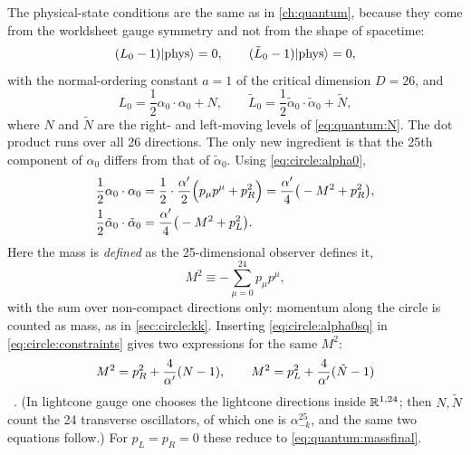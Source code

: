 The physical-state conditions are the same as in \cref{ch:quantum}, because they come from the
worldsheet gauge symmetry and not from the shape of spacetime:
\begin{equation}\label{eq:circle:constraints}
 (L_0-1)|\text{phys}\rangle=0,\qquad(\tilde L_0-1)|\text{phys}\rangle=0 ,
\end{equation}
with the normal-ordering constant $a=1$ of the critical dimension $D=26$, and
\begin{equation}\label{eq:circle:L0}
 L_0=\frac12\alpha_0\cdot\alpha_0+N,\qquad
 \tilde L_0=\frac12\tilde\alpha_0\cdot\tilde\alpha_0+\tilde N ,
\end{equation}
where $N$ and $\tilde N$ are the right- and left-moving levels of \cref{eq:quantum:N}. The
dot product runs over all 26 directions. The only new ingredient is that the 25th component
of $\alpha_0$ differs from that of $\tilde\alpha_0$. Using \eqref{eq:circle:alpha0},
\begin{align}
 \frac12\alpha_0\cdot\alpha_0
 &=\frac12\cdot\frac{\alpha'}2\Big(p_\mu p^\mu+p_R^2\Big)=\frac{\alpha'}4\big(-M^2+p_R^2\big),\nonumber\\
 \frac12\tilde\alpha_0\cdot\tilde\alpha_0
 &=\frac{\alpha'}4\big(-M^2+p_L^2\big).\label{eq:circle:alpha0sq}
\end{align}
Here the mass is \emph{defined} as the 25-dimensional observer defines it,
\begin{equation}\label{eq:circle:massdef}
 M^2\equiv-\sum_{\mu=0}^{24}p_\mu p^\mu ,
\end{equation}
with the sum over non-compact directions only: momentum along the circle is counted as mass,
as in \cref{sec:circle:kk}. Inserting \eqref{eq:circle:alpha0sq} in
\eqref{eq:circle:constraints} gives two expressions for the same $M^2$:
\begin{equation}\label{eq:circle:twomass}
 M^2=p_R^2+\frac4{\alpha'}(N-1),\qquad M^2=p_L^2+\frac4{\alpha'}(\tilde N-1)
\end{equation}
\TL\ . (In lightcone gauge one chooses the lightcone
directions inside $\mathbb{R}^{1,24}$; then $N,\tilde N$ count the 24 transverse oscillators, of
which one is $\alpha^{25}_{-k}$, and the same two equations follow.) For $p_L=p_R=0$ these
reduce to \cref{eq:quantum:massfinal}.

